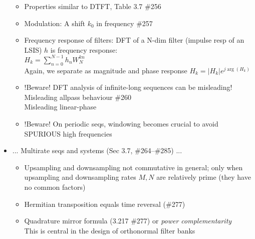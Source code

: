 \documentclass{article}
\newcommand{\cg}{\color{gray}}
\newcommand{\fs}{\footnotesize}
\begin{document}
\begin{itemize}
\begin{itemize}
		\item Properties similar to DTFT, Table 3.7 \#256
		\item Modulation: {\cg A shift $k_0$ in frequency \#257}
		\item Frequency response of filters: {\cg DFT of a N-dim filter (impulse resp of an LSIS) $h$ is frequency response:} \\
		{\cg\fs $H_k=\sum\limits_{n=0}^{N-1}h_n W_N^{kn}$\\
		Again, we separate as magnitude and phase response $H_k=|H_k|e^{j\arg(H_k)}$ 
		}
		\item !Beware! DFT analysis of infinite-long sequences can be misleading!\\
		{\cg Misleading allpass behaviour \#260\\
		Misleading linear-phase
		}
		\item !Beware! On periodic seqs, windowing becomes crucial to avoid SPURIOUS high frequencies
	\end{itemize}
	\item ... Multirate seqs and systems (Sec 3.7, \#264--\#285) ...
	\begin{itemize}
		\item Upsampling and downsampling not commutative in general; {\cg only when upsampling and downsampling rates $M,N$ are relatively prime (they have no common factors)}
		\item Hermitian transposition equals time reversal (\#277)
		\item Quadrature mirror formula (3.217 \#277) or \textit{power complementarity}\\
		{\cg\fs This is central in the design of orthonormal filter banks} 
	\end{itemize}
	

\end{itemize}
\end{document}
